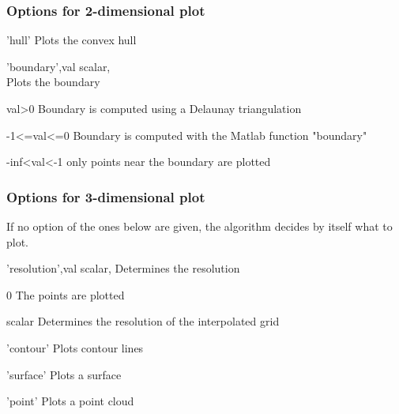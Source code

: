\subsubsection*{Options for 2-dimensional plot}
\begin{param}                        
   
\item['hull']              Plots the convex hull
\item['boundary',val]      scalar, \\
                           Plots the boundary 
    \begin{param}
    \item[val>0]           Boundary is computed using a Delaunay triangulation
    \item[-1<=val<=0]      Boundary is computed with the Matlab function "boundary"
    \item[-inf<val<-1]     only points near the boundary are plotted    
    \end{param}                               

\end{param}

\subsubsection*{Options for 3-dimensional plot}
If no option of the ones below are given, the algorithm decides by itself what to plot.
\begin{param}      

\item['resolution',val]    scalar, 
                           Determines the resolution
\begin{param}                           
       \item[0]      The points are plotted
       \item[scalar] Determines the resolution of the interpolated grid
\end{param}        
\item['contour']           Plots contour lines
\item['surface']           Plots a surface
\item['point']             Plots a point cloud
\end{param}

